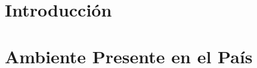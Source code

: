 \documentclass[12pt,journal,compsoc]{IEEEtran}
\begin{document}
%
\IEEEpeerreviewmaketitle

\section{Introducci\'{o}n}



\section{Ambiente Presente en el Pa\'{i}s}
%
%
\end{document}
